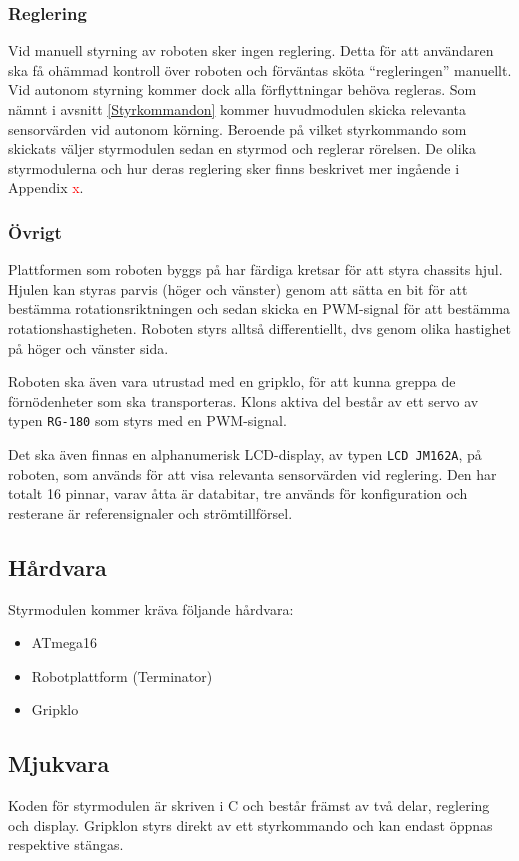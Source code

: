 \documentclass[11pt]{article}
\begin{document}
\begin{flushleft}
\subsubsection{Reglering}
Vid manuell styrning av roboten sker ingen reglering. Detta för att användaren ska få ohämmad kontroll över roboten och förväntas sköta ``regleringen'' manuellt. Vid autonom styrning kommer dock alla förflyttningar behöva regleras. Som nämnt i avsnitt \ref{Styrkommandon} kommer huvudmodulen skicka relevanta sensorvärden vid autonom körning. Beroende på vilket styrkommando som skickats väljer styrmodulen sedan en styrmod och reglerar rörelsen. De olika styrmodulerna och hur deras reglering sker finns beskrivet mer ingående i Appendix \textcolor{red}{x}.

\subsubsection{Övrigt}
Plattformen som roboten byggs på har färdiga kretsar för att styra chassits hjul. Hjulen kan styras parvis (höger och vänster) genom att sätta en bit för att bestämma rotationsriktningen och sedan skicka en PWM-signal för att bestämma rotationshastigheten. Roboten styrs alltså differentiellt, dvs genom olika hastighet på höger och vänster sida.

Roboten ska även vara utrustad med en gripklo, för att kunna greppa de förnödenheter som ska transporteras. Klons aktiva del består av ett servo av typen \verb+RG-180+ som styrs med en PWM-signal.

Det ska även finnas en alphanumerisk LCD-display, av typen \verb+LCD JM162A+, på roboten, som används för att visa relevanta sensorvärden vid reglering. Den har totalt 16 pinnar, varav åtta är databitar, tre används för konfiguration och resterane är referensignaler och strömtillförsel.

\subsection{Hårdvara}
Styrmodulen kommer kräva följande hårdvara:
\begin{itemize}
	\item ATmega16
	\item Robotplattform (Terminator)
	\item Gripklo %
\end{itemize}

\subsection{Mjukvara}
Koden för styrmodulen är skriven i C och består främst av två delar, reglering och display. Gripklon styrs direkt av ett styrkommando och kan endast öppnas respektive stängas.


\end{flushleft}
\end{document}
